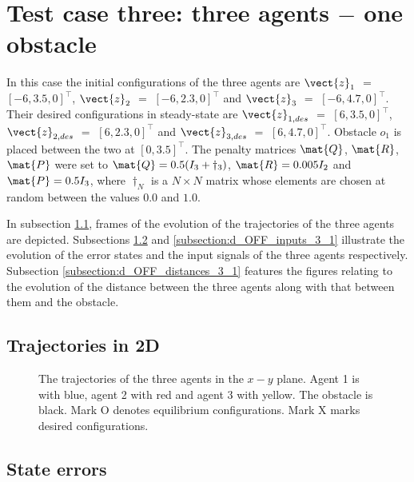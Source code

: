 \section{Test case three: three agents $-$ one obstacle}

In this case the initial configurations of the three agents are
$\vect{z}_1$ $=$ $[-6, 3.5, 0]^{\top}$,
$\vect{z}_2$ $=$ $[-6, 2.3, 0]^{\top}$ and
$\vect{z}_3$ $=$ $[-6, 4.7, 0]^{\top}$.
Their desired configurations in steady-state are
$\vect{z}_{1,des}$ $=$ $[6, 3.5, 0]^{\top}$,
$\vect{z}_{2,des}$ $=$ $[6, 2.3, 0]^{\top}$ and
$\vect{z}_{3,des}$ $=$ $[6, 4.7, 0]^{\top}$.
Obstacle $o_1$ is placed between the two at $[0, 3.5]^{\top}$. The penalty
matrices $\mat{Q}$, $\mat{R}$, $\mat{P}$ were set to
$\mat{Q} = 0.5 (I_3 + \dagger_3)$, $\mat{R} = 0.005 I_2$ and
$\mat{P} = 0.5 I_3$, where $\dagger_N$ is a $N \times N$ matrix whose
elements are chosen at random between the values $0.0$ and $1.0$.

In subsection \ref{subsection:d_OFF_trajectories_3_1}, frames of the evolution of the
trajectories of the three agents are depicted. Subsections
\ref{subsection:d_OFF_errors_3_1} and \ref{subsection:d_OFF_inputs_3_1} illustrate
the evolution of the error states and the input signals of the three agents
respectively. Subsection \ref{subsection:d_OFF_distances_3_1} features the
figures relating to the evolution of the distance between the three agents
along with that between them and the obstacle.


\subsection{Trajectories in 2D}
\label{subsection:d_OFF_trajectories_3_1}

\begin{figure}[H]
  
  \caption{The trajectories of the three agents in the $x-y$ plane. Agent 1 is with
    blue, agent 2 with red and agent 3 with yellow. The obstacle is black.
    Mark O denotes equilibrium configurations. Mark X marks desired configurations.}
  \label{fig:d_OFF_trajectory_3_1}
\end{figure}


\subsection{State errors}
\label{subsection:d_OFF_errors_3_1}

